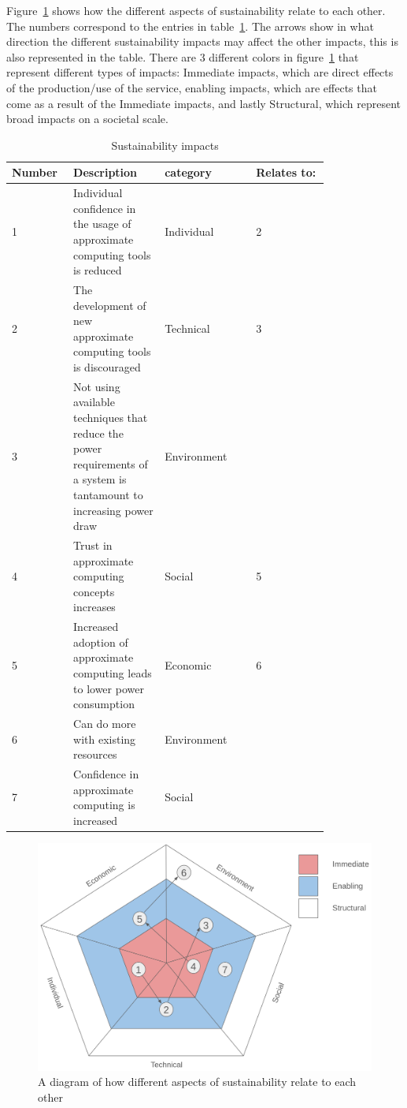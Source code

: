 Figure~\ref{fig:SusAF_diagram} shows how the different aspects of sustainability relate to each other. The numbers correspond to the entries in table~\ref{table:SusAF_table}. The arrows show in what direction the different sustainability impacts may affect the other impacts, this is also represented in the table.
There are 3 different colors in figure~\ref{fig:SusAF_diagram} that represent different types of impacts: Immediate impacts, which are direct effects of the production/use of the service, enabling impacts, which are effects that come as a result of the Immediate impacts, and lastly Structural, which represent broad impacts on a societal scale.

\begin{table}[htb]
    \centering
    \caption{Sustainability impacts}
    \label{table:SusAF_table}
    \begin{tabular}{p{0.1\linewidth}|p{0.25\linewidth}|p{0.25\linewidth}|p{0.2\linewidth}} 
        Number & Description & category & Relates to: \\
        \hline
         1 & Individual confidence in the usage of approximate computing tools is reduced & Individual & 2 \\
         2 & The development of new approximate computing tools is discouraged & Technical & 3\\
         3 & Not using available techniques that reduce the power requirements of a system is tantamount to increasing power draw & Environment & \\
         4 & Trust in approximate computing concepts increases & Social &  5 \\
         5 & Increased adoption of approximate computing leads to lower power consumption & Economic &6 \\    
         6 & Can do more with existing resources & Environment & \\
         7 & Confidence in approximate computing is increased& Social&  \\
    \end{tabular}
    
\end{table}


\begin{figure}[h]
    \centering
    \includegraphics[width=0.75\linewidth]{Images/SusAF_diagram.png}
    \caption{A diagram of how different aspects of sustainability relate to each other}
    \label{fig:SusAF_diagram}
\end{figure}